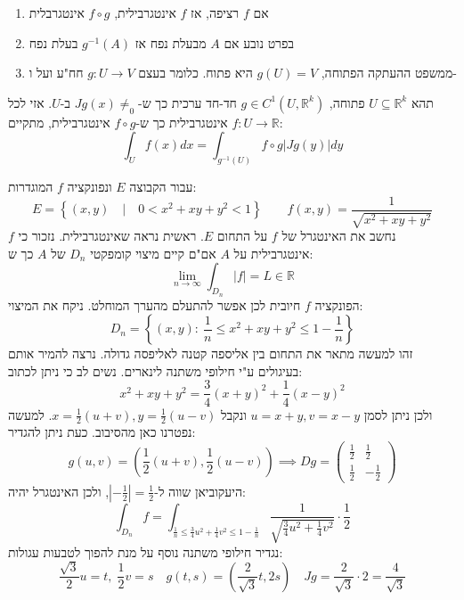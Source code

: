 \documentclass{tstextbook}
\begin{document}
\begin{enumerate}
  \item אם \(f\) רציפה, אז \(f\) אינטגרבילית, \(f\circ g\) אינטגרבלית 


  \item בפרט נובע אם \(A\) מבעלת נפח אז \(g^{-1}(A)\) בעלת נפח 


  \item ממשפט ההעתקה הפתוחה, \(g(U)=V\) היא פתוח. כלומר בעצם \(g:U\to V\) חח"ע ועל ו- 


\end{enumerate}
\begin{corollary}
תהא \(U\subseteq \mathbb{R}^k\) פתוחה, \(g\in C^1\left( U,\mathbb{R}^k \right)\) חד-חד ערכית כך ש-\(Jg(x)\neq_{0}\) ב-\(U\). אזי לכל \(f:U\to \mathbb{R}\) אינטגרבילית כך ש-\(f\circ g\) אינטגרבילית, מתקיים:
$$\int_{U}f(x)d x=\int_{g^{-1}(U)}f\circ g|J g(y)|d y$$

\end{corollary}
\begin{example}
עבור הקבוצה \(E\) ונפונקציה \(f\) המוגדרות:
$$E=\left\{ (x,y)\quad|\quad0<x^{2}+x y+y^{2}<1 \right\}\qquad f(x,y)=\frac{1}{\sqrt{x^{2}+x y+y^{2}}}$$
נחשב את האינטגרל של \(f\) על התחום \(E\). ראשית נראה שאינטגרבילית.
נזכור כי \(f\) אינטגרבילית על \(A\) אם"ם קיים מיצוי קומפקטי \(D_{n}\) של \(A\) כך ש:
$$\operatorname*{lim}_{n\to\infty}\int_{D_{n}}|f|=L\in\mathbb{R}$$
הפונקציה \(f\) חיובית לכן אפשר להתעלם מהערך המוחלט. ניקח את המיצוי:
$$D_{n}=\left\{(x,y):\ {\textstyle{\frac{1}{n}}}\leq x^{2}+x y+y^{2}\leq1-{\textstyle{\frac{1}{n}}}\right\}$$
זהו למעשה מתאר את התחום בין אליספה קטנה לאליפסה גדולה. נרצה להמיר אותם בעיגולים ע"י חילופי משתנה לינארים. נשים לב כי ניתן לכתוב:
$$x^{2}+x y+y^{2}=\frac{3}{4}(x+y)^{2}+\frac{1}{4}(x-y)^{2}$$
ולכן ניתן לסמן \(u=x+y,v=x-y\) ונקבל \(x=\frac{1}{2}(u+v),y=\frac{1}{2}(u-v)\). למעשה נפטרנו כאן מהסיבוב. כעת ניתן להגדיר:
$$g(u,v)=\left( \frac{1}{2}(u+v),\frac{1}{2}(u-v) \right)\implies Dg=\begin{pmatrix}\frac{1}{2} & \frac{1}{2}\\ \frac{1}{2}  & -\frac{1}{2}
\end{pmatrix}$$
היעקוביאן שווה ל-\(\left\lvert  -\frac{1}{2}  \right\rvert=\frac{1}{2}\), ולכן האינטגרל יהיה:
$$\int_{D_{n}}f=\int_{\frac{1}{n}\leq\frac{3}{4}u^{2}+\frac{1}{4}v^{2}\leq1-\frac{1}{n}}\frac{1}{\sqrt{\frac{3}{4}u^{2}+\frac{1}{4}v^{2}}}\cdot\frac{1}{2}$$
נגדיר חילופי משתנה נוסף על מנת להפוך לטבעות עגולות:
$${{\displaystyle\frac{\sqrt{3}}{2}u=t,\;\frac{1}{2}v=s}}\quad  {{\displaystyle g(t,s)=\left( \frac{2}{\sqrt{3}}t,2s \right)}}\quad {{\displaystyle J g=\frac{2}{\sqrt{3}}\cdot2=\frac{4}{\sqrt{3}}}}$$

\end{example}
\end{document}
